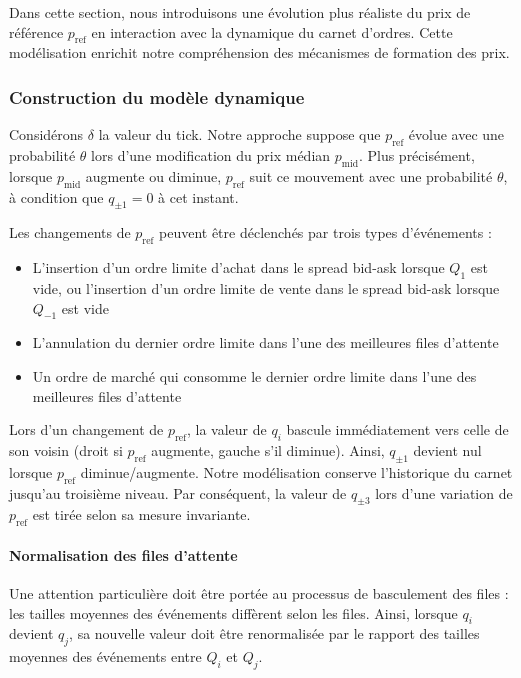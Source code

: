 \documentclass[12pt,a4paper]{article}
\theoremstyle{definition}
\theoremstyle{remark}
\begin{document}
    Dans cette section, nous introduisons une évolution plus réaliste du prix de référence $p_{\text{ref}}$ en interaction avec la dynamique du carnet d'ordres. Cette modélisation enrichit notre compréhension des mécanismes de formation des prix.

    \subsubsection{Construction du modèle dynamique}

    Considérons $\delta$ la valeur du tick. Notre approche suppose que $p_{\text{ref}}$ évolue avec une probabilité $\theta$ lors d'une modification du prix médian $p_{\text{mid}}$. Plus précisément, lorsque $p_{\text{mid}}$ augmente ou diminue, $p_{\text{ref}}$ suit ce mouvement avec une probabilité $\theta$, à condition que $q_{\pm1}=0$ à cet instant.

    Les changements de $p_{\text{ref}}$ peuvent être déclenchés par trois types d'événements :

    \begin{itemize}
        \item L'insertion d'un ordre limite d'achat dans le spread bid-ask lorsque $Q_1$ est vide, ou l'insertion d'un ordre limite de vente dans le spread bid-ask lorsque $Q_{-1}$ est vide
        \item L'annulation du dernier ordre limite dans l'une des meilleures files d'attente
        \item Un ordre de marché qui consomme le dernier ordre limite dans l'une des meilleures files d'attente
    \end{itemize}

    Lors d'un changement de $p_{\text{ref}}$, la valeur de $q_i$ bascule immédiatement vers celle de son voisin (droit si $p_{\text{ref}}$ augmente, gauche s'il diminue). Ainsi, $q_{\pm1}$ devient nul lorsque $p_{\text{ref}}$ diminue/augmente. Notre modélisation conserve l'historique du carnet jusqu'au troisième niveau. Par conséquent, la valeur de $q_{\pm3}$ lors d'une variation de $p_{\text{ref}}$ est tirée selon sa mesure invariante.

    \paragraph{Normalisation des files d'attente}
    Une attention particulière doit être portée au processus de basculement des files : les tailles moyennes des événements diffèrent selon les files. Ainsi, lorsque $q_i$ devient $q_j$, sa nouvelle valeur doit être renormalisée par le rapport des tailles moyennes des événements entre $Q_i$ et $Q_j$.
\end{document}
